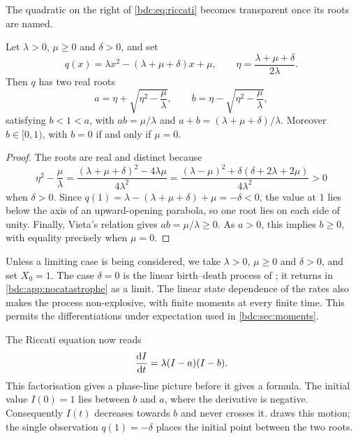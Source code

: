 The quadratic on the right of \cref{bdc:eq:riccati} becomes transparent once its
roots are named.

\begin{lemma}
\label{bdc:lem:roots}
Let $\lambda>0$, $\mu\ge0$ and $\delta>0$, and set
\[
q(x)=\lambda x^2-(\lambda+\mu+\delta)x+\mu,
\qquad
\eta=\frac{\lambda+\mu+\delta}{2\lambda}.
\]
Then $q$ has two real roots
\[
a=\eta+\sqrt{\eta^2-\frac{\mu}{\lambda}},
\qquad
b=\eta-\sqrt{\eta^2-\frac{\mu}{\lambda}},
\]
satisfying $b<1<a$, with $ab=\mu/\lambda$ and
$a+b=(\lambda+\mu+\delta)/\lambda$. Moreover $b\in[0,1)$, with $b=0$ if and
only if $\mu=0$.
\end{lemma}

\begin{proof}
The roots are real and distinct because
\[
\eta^2-\frac{\mu}{\lambda}
=\frac{(\lambda+\mu+\delta)^2-4\lambda\mu}{4\lambda^2}
=\frac{(\lambda-\mu)^2+\delta(\delta+2\lambda+2\mu)}{4\lambda^2}>0
\]
when $\delta>0$. Since
$q(1)=\lambda-(\lambda+\mu+\delta)+\mu=-\delta<0$, the value at $1$ lies below
the axis of an upward-opening parabola, so one root lies on each side of unity.
Finally, Vieta's relation gives $ab=\mu/\lambda\ge0$. As $a>0$, this implies
$b\ge0$, with equality precisely when $\mu=0$.
\end{proof}

\begin{remark}
\label{bdc:rem:assumptions}
Unless a limiting case is being considered, we take
$\lambda>0$, $\mu\ge0$ and $\delta>0$, and set $X_0=1$.
The case $\delta=0$ is the linear birth--death process of
; it returns in
\cref{bdc:app:nocatastrophe} as a limit. The linear state dependence of the
rates also makes the process non-explosive, with finite moments at every finite
time. This permits the differentiations under expectation used in
\cref{bdc:sec:moments}.
\end{remark}

The Riccati equation now reads
\begin{equation}
\label{bdc:eq:riccatifact}
\frac{\mathrm{d} I}{\mathrm{d} t} = \lambda(I-a)(I-b).
\end{equation}
This factorisation gives a phase-line picture before it gives a formula.
The initial value $I(0)=1$ lies between $b$ and $a$, where the derivative is
negative. Consequently $I(t)$ decreases towards $b$ and never crosses it.
 draws this motion; the single observation
$q(1)=-\delta$ places the initial point between the two roots.

